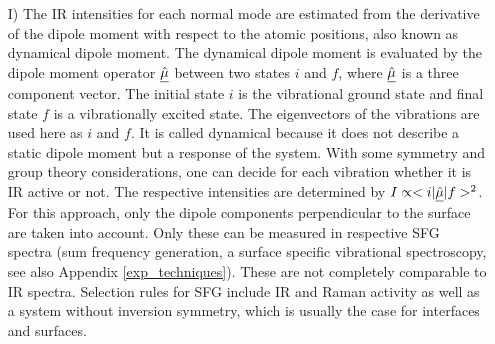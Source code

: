 \documentclass[11pt,DIV=13,BCOR=5mm,a4paper,headinclude]{scrbook}
\begin{document}
\begin{itemize}
 \item[I)] The IR intensities for each normal mode are estimated from the derivative of the dipole moment with respect to the atomic positions, also known as dynamical dipole moment\cite{dyn-dip,Yang2012}.
The dynamical dipole moment is evaluated by the dipole moment operator $\uline{\hat{\mu}}$ between two states $i$ and $f$, where $\uline{\hat{\mu}}$ is a three component vector.
The initial state $i$ is the vibrational ground state and final state $f$ is a vibrationally excited state.
The eigenvectors of the vibrations are used here as $i$ and $f$.
It is called dynamical because it does not describe a static dipole moment but a response of the system.
With some symmetry and group theory considerations, one can decide for each vibration whether it is IR active or not.
The respective intensities are determined by $I\propto <i|\uline{\hat{\mu}}|f>^2$.
For this approach, only the dipole components perpendicular to the surface are taken into account.
Only these can be measured in respective SFG spectra (sum frequency generation, a surface specific vibrational spectroscopy, see also Appendix \ref{exp_techniques}).
These are not completely comparable to IR spectra.
Selection rules for SFG include IR and Raman activity as well as a system without inversion symmetry, which is usually the case for interfaces and surfaces.
  

\end{itemize}
\end{document}
